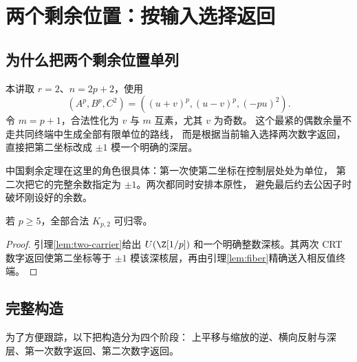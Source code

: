 \chapter{两个剩余位置：按输入选择返回}\label{ch:two}

\section{为什么把两个剩余位置单列}
本讲取 $r=2$、$n=2p+2$，使用
\[
(A^p,B^p,C^2)=((u+v)^p,(u-v)^p,(-pu)^2).
\]
令 $m=p+1$，合法性化为 $v$ 与 $m$ 互素，尤其 $v$ 为奇数。
这个最紧的偶数余量不走共同终端中生成全部有限单位的路线，
而是根据当前输入选择两次数字返回，直接把第二坐标改成 $\pm1$ 模一个明确的深层。

中国剩余定理在这里的角色很具体：第一次使第二坐标在控制层处处为单位，
第二次把它的完整余数指定为 $\pm1$。两次都同时安排本原性，
避免最后约去公因子时破坏刚设好的余数。

\begin{proposition}\label{prop:r2}
若 $p\ge5$，全部合法 $K_{p,2}$ 可归零。
\end{proposition}
\begin{proof}
引理\ref{lem:two-carrier}给出 $U(\Z[1/p])$ 和一个明确整数深核。其两次 CRT 数字返回使第二坐标等于 $\pm1$ 模该深核层，再由引理\ref{lem:fiber}精确送入相反值终端。
\end{proof}



\section{完整构造}
为了方便跟踪，以下把构造分为四个阶段：
上平移与缩放的逆、横向反射与深层、第一次数字返回、第二次数字返回。

